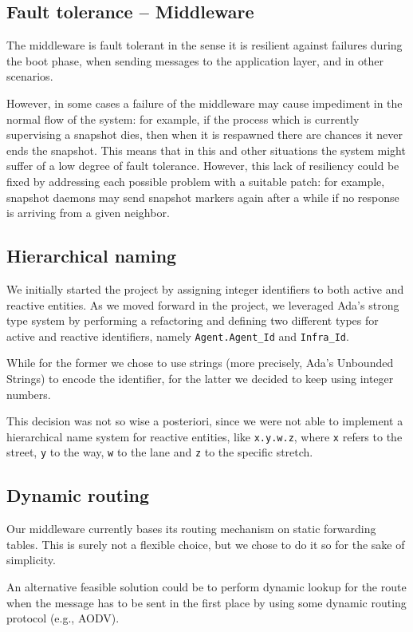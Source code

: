 \subsection{Fault tolerance -- Middleware}
The middleware is fault tolerant in the sense it is resilient against failures
during the boot phase, when sending messages to the application layer, and in
other scenarios.

However, in some cases a failure of the middleware may cause impediment in the
normal flow of the system: for example, if the process which is currently
supervising a snapshot dies, then when it is respawned there are chances it
never ends the snapshot.
This means that in this and other situations the system might suffer of a low
degree of fault tolerance. However, this lack of resiliency could be fixed by
addressing each possible problem with a suitable patch: for example, snapshot
daemons may send snapshot markers again after a while if no response is
arriving from a given neighbor.

\subsection{Hierarchical naming}
We initially started the project by assigning integer identifiers to both
active and reactive entities. As we moved forward in the project, we leveraged
Ada's strong type system by performing a refactoring and defining two different
types for active and reactive identifiers, namely \texttt{Agent.Agent\_Id} and
\texttt{Infra\_Id}.

While for the former we chose to use strings (more precisely, Ada's Unbounded
Strings) to encode the identifier, for the latter we decided to keep using
integer numbers.

This decision was not so wise a posteriori, since we were not able to implement
a hierarchical name system for reactive entities, like \texttt{x.y.w.z}, where
\texttt{x} refers to the street, \texttt{y} to the way, \texttt{w} to the lane
and \texttt{z} to the specific stretch.

\subsection{Dynamic routing}
Our middleware currently bases its routing mechanism on static forwarding
tables. This is surely not a flexible choice, but we chose to do it so for the
sake of simplicity.

An alternative feasible solution could be to perform dynamic lookup for the
route when the message has to be sent in the first place by using some dynamic
routing protocol (e.g., AODV).

